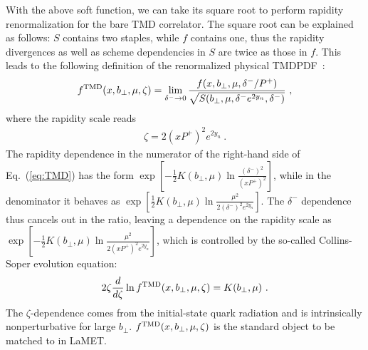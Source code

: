 \documentclass[aps,rmp,reprint,amsmath,amssymb,graphicx,longbibliography]{revtex4-1} %
\begin{document}
With the above soft function, we can take its square root to perform rapidity renormalization for the bare TMD correlator. The square root can be explained as follows: $S$ contains two staples, while $f$ contains one, thus the rapidity divergences as well as scheme dependencies in $S$ are twice as those in $f$. This leads to the following definition of the renormalized physical TMDPDF~\cite{Echevarria:2012js,Collins:2012uy}:
\begin{align}\label{eq:TMD}
	f^{\rm TMD}(x,b_\perp,\mu,\zeta)=\lim_{\delta^- \rightarrow 0}\frac{f(x,b_\perp,\mu,\delta^-/P^+)}{\sqrt{S(b_\perp,\mu,\delta^- e^{2y_n},\delta^-)}} \ ,
\end{align}
where the rapidity scale reads
\begin{align} \label{zeta}
	\zeta=2(xP^+)^2 e^{2y_n} \ .
\end{align}
The rapidity dependence in the numerator of the right-hand side of Eq.~(\ref{eq:TMD}) has the form $\exp[-\frac{1}{2}K(b_\perp,\mu)\ln \frac{(\delta^-)^2}{(xP^+)^2}]$, while in the denominator it behaves as $\exp[\frac{1}{2}K(b_\perp,\mu)\ln \frac{\mu^2}{2(\delta^-)^2e^{2y_n}}]$. The $\delta^-$ dependence thus cancels out in the ratio, leaving a dependence on the rapidity scale as $\exp[-\frac{1}{2}K(b_\perp,\mu)\ln \frac{\mu^2}{2(xP^+)^2e^{2y_n}}]$, which is controlled by the so-called Collins-Soper evolution equation:
\begin{align}\label{eq:cs}
	2\zeta \frac{d}{d\zeta} \ln  f^{\rm TMD}(x,b_\perp,\mu,\zeta)=K(b_\perp,\mu) \ .
\end{align}
The $\zeta$-dependence comes from the initial-state quark radiation and is intrinsically nonperturbative for large $b_\perp$. $f^{\rm TMD}(x,b_\perp,\mu,\zeta)$ is the standard object to be matched to in LaMET.
\end{document}
